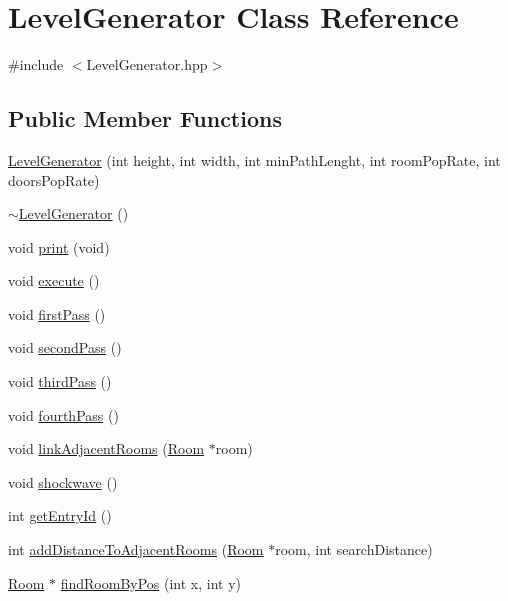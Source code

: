 \hypertarget{class_level_generator}{\section{Level\-Generator Class Reference}
\label{class_level_generator}
}


{\ttfamily \#include $<$Level\-Generator.\-hpp$>$}

\subsection*{Public Member Functions}
\begin{DoxyCompactItemize}
\item 
\hyperlink{class_level_generator_a2ed675e422aedcf5ecab936468627128}{Level\-Generator} (int height, int width, int min\-Path\-Lenght, int room\-Pop\-Rate, int doors\-Pop\-Rate)
\item 
\hyperlink{class_level_generator_a9bd612e10a3d769537ba042a76c0cb5f}{$\sim$\-Level\-Generator} ()
\item 
void \hyperlink{class_level_generator_ad3a873efd53cec998e5b3cbec90b1e6d}{print} (void)
\item 
void \hyperlink{class_level_generator_a0adda93371151dcbda015fd4a9a5b971}{execute} ()
\item 
void \hyperlink{class_level_generator_a67392d5702d8bb9b28d3b87cfa4f4435}{first\-Pass} ()
\item 
void \hyperlink{class_level_generator_aaed4a6d35bf4ea14a1d472b247720f46}{second\-Pass} ()
\item 
void \hyperlink{class_level_generator_a8e8540de5d26ae5fd37f01863bb3a3ab}{third\-Pass} ()
\item 
void \hyperlink{class_level_generator_a9b9e75025c7dcacb88bcb717f2aa9f3b}{fourth\-Pass} ()
\item 
void \hyperlink{class_level_generator_aaaccd1f1c3b4331d30ba5a56b3d027f8}{link\-Adjacent\-Rooms} (\hyperlink{class_room}{Room} $\ast$room)
\item 
void \hyperlink{class_level_generator_afaa688bd1e11103c8afb45dbfa41c0c7}{shockwave} ()
\item 
int \hyperlink{class_level_generator_ab9f4dd15ee1d8f0659d3df0956d087af}{get\-Entry\-Id} ()
\item 
int \hyperlink{class_level_generator_af8a3c3f49855932e09da03107205c72f}{add\-Distance\-To\-Adjacent\-Rooms} (\hyperlink{class_room}{Room} $\ast$room, int search\-Distance)
\item 
\hyperlink{class_room}{Room} $\ast$ \hyperlink{class_level_generator_a6af493402fdf30516ea0c122d2c82a4b}{find\-Room\-By\-Pos} (int x, int y)
\end{DoxyCompactItemize}


